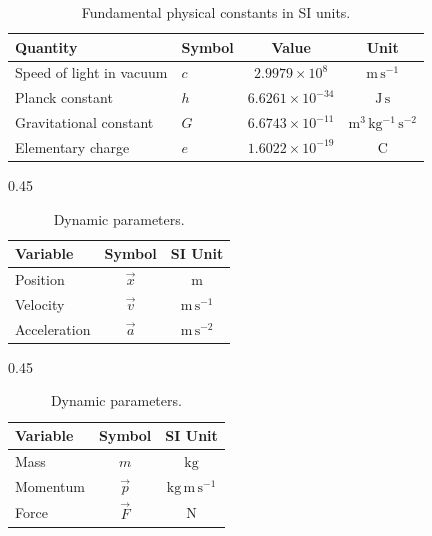 \begin{table}[htpb]
    \centering
    \caption{Fundamental physical constants in SI units.}
    \label{tab:constants}
    \begin{tabular}{llcc}
        \toprule
        Quantity                 & Symbol & Value                    & Unit                            \\
        \midrule
        Speed of light in vacuum & $c$    & $2.9979 \times 10^8$     & $\mathrm{m\,s^{-1}}$            \\
        Planck constant          & $h$    & $6.6261 \times 10^{-34}$ & $\mathrm{J\,s}$                 \\
        Gravitational constant   & $G$    & $6.6743 \times 10^{-11}$ & $\mathrm{m^3\,kg^{-1}\,s^{-2}}$ \\
        Elementary charge        & $e$    & $1.6022 \times 10^{-19}$ & $\mathrm{C}$                    \\
        \bottomrule
    \end{tabular}
\end{table}

\begin{table}[htpb]
    \centering
    \caption{Multi-table comparison of kinematic and dynamic physical quantities.}
    \label{tab:mechanics}
    \begin{subtable}[b]{0.45\textwidth}
        \centering
        \caption{Kinematic parameters.}
        \label{tab:sub_kinematics}
        \begin{tabular}{lcc}
            \toprule
            Variable     & Symbol    & SI Unit              \\
            \midrule
            Position     & $\vec{x}$ & $\mathrm{m}$         \\
            Velocity     & $\vec{v}$ & $\mathrm{m\,s^{-1}}$ \\
            Acceleration & $\vec{a}$ & $\mathrm{m\,s^{-2}}$ \\
            \bottomrule
        \end{tabular}
    \end{subtable}
    \hfill
    \begin{subtable}[b]{0.45\textwidth}
        \centering
        \caption{Dynamic parameters.}
        \label{tab:sub_dynamics}
        \begin{tabular}{lcc}
            \toprule
            Variable & Symbol    & SI Unit                  \\
            \midrule
            Mass     & $m$       & $\mathrm{kg}$            \\
            Momentum & $\vec{p}$ & $\mathrm{kg\,m\,s^{-1}}$ \\
            Force    & $\vec{F}$ & $\mathrm{N}$             \\
            \bottomrule
        \end{tabular}
    \end{subtable}
\end{table}


